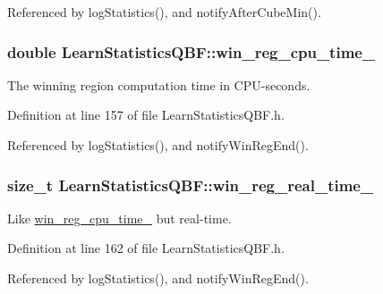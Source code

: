 Referenced by log\-Statistics(), and notify\-After\-Cube\-Min().

\hypertarget{classLearnStatisticsQBF_a679a221c1cbf3330572f93d850976289}{
\subsubsection[{win\-\_\-reg\-\_\-cpu\-\_\-time\-\_\-}]{\setlength{\rightskip}{0pt plus 5cm}double Learn\-Statistics\-Q\-B\-F\-::win\-\_\-reg\-\_\-cpu\-\_\-time\-\_\-\hspace{0.3cm}{\ttfamily [protected]}}}\label{classLearnStatisticsQBF_a679a221c1cbf3330572f93d850976289}


The winning region computation time in C\-P\-U-\/seconds. 



Definition at line 157 of file Learn\-Statistics\-Q\-B\-F.\-h.



Referenced by log\-Statistics(), and notify\-Win\-Reg\-End().

\hypertarget{classLearnStatisticsQBF_a58013212d789d3c025b521cd150dc12d}{
\subsubsection[{win\-\_\-reg\-\_\-real\-\_\-time\-\_\-}]{\setlength{\rightskip}{0pt plus 5cm}size\-\_\-t Learn\-Statistics\-Q\-B\-F\-::win\-\_\-reg\-\_\-real\-\_\-time\-\_\-\hspace{0.3cm}{\ttfamily [protected]}}}\label{classLearnStatisticsQBF_a58013212d789d3c025b521cd150dc12d}


Like \hyperlink{classLearnStatisticsQBF_a679a221c1cbf3330572f93d850976289}{win\-\_\-reg\-\_\-cpu\-\_\-time\-\_\-} but real-\/time. 



Definition at line 162 of file Learn\-Statistics\-Q\-B\-F.\-h.



Referenced by log\-Statistics(), and notify\-Win\-Reg\-End().

